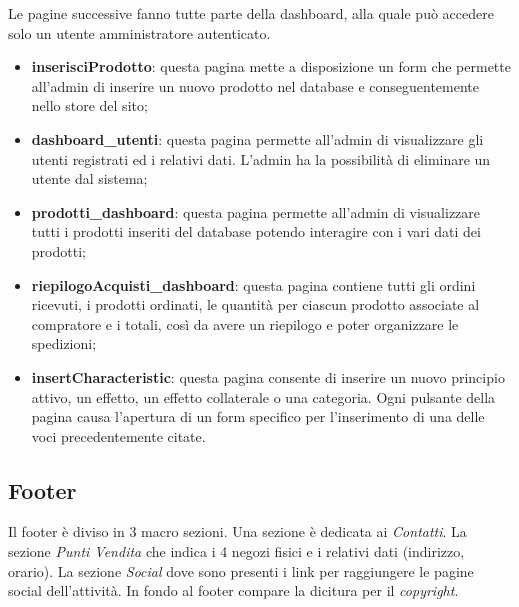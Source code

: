     Le pagine successive fanno tutte parte della dashboard, alla quale può accedere solo un utente amministratore autenticato.
\begin{itemize}
    \item \textbf{inserisciProdotto}: questa pagina mette a disposizione un form che permette all'admin di inserire un nuovo prodotto nel database e conseguentemente nello store del sito;
    \item \textbf{dashboard\_utenti}: questa pagina permette all'admin di visualizzare gli utenti registrati ed i relativi dati. L'admin ha la possibilità di eliminare un utente dal sistema;
    \item \textbf{prodotti\_dashboard}: questa pagina permette all'admin di visualizzare tutti i prodotti inseriti del database potendo interagire con i vari dati dei prodotti;
    \item \textbf{riepilogoAcquisti\_dashboard}: questa pagina contiene tutti gli ordini ricevuti, i prodotti ordinati, le quantità per ciascun prodotto associate al compratore e i totali, così da avere un riepilogo e poter organizzare le spedizioni;
    \item \textbf{insertCharacteristic}: questa pagina consente di inserire un nuovo principio attivo, un effetto, un effetto collaterale o una categoria. Ogni pulsante della pagina causa l'apertura di un form specifico per l'inserimento di una delle voci precedentemente citate.
\end{itemize}

\subsection{Footer}
Il footer è diviso in 3 macro sezioni.
Una sezione è dedicata ai \textit{Contatti}.
La sezione \textit{Punti Vendita} che indica i 4 negozi fisici e i relativi dati (indirizzo, orario).
La sezione \textit{Social} dove sono presenti i link per raggiungere le pagine social dell'attività.
In fondo al footer compare la dicitura per il \textit{copyright}.